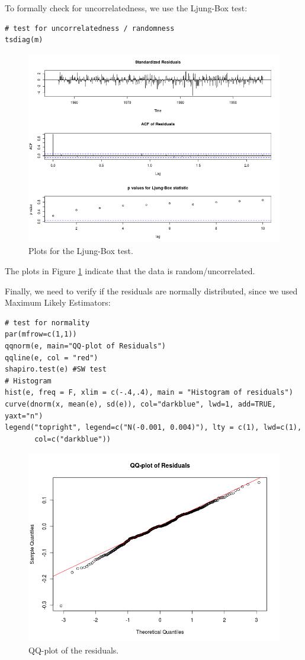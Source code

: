 \documentclass[]{article}
\begin{document}
To formally check for uncorrelatedness, we use the Ljung-Box test:
\begin{Verbatim}[frame=single]
# test for uncorrelatedness / randomness
tsdiag(m)
\end{Verbatim}

\begin{figure}[!ht]
\centering
\includegraphics[width=.8\textwidth]{lbeerljung.png}
\caption{Plots for the Ljung-Box test.}
\label{lbeerljung}
\end{figure}

The plots in Figure \ref{lbeerljung} indicate that the data is random/uncorrelated.

Finally, we need to verify if the residuals are normally distributed, since we used Maximum Likely Estimators:
\begin{Verbatim}[frame=single]
# test for normality
par(mfrow=c(1,1))
qqnorm(e, main="QQ-plot of Residuals")
qqline(e, col = "red")
shapiro.test(e) #SW test
# Histogram
hist(e, freq = F, xlim = c(-.4,.4), main = "Histogram of residuals")
curve(dnorm(x, mean(e), sd(e)), col="darkblue", lwd=1, add=TRUE, yaxt="n")
legend("topright", legend=c("N(-0.001, 0.004)"), lty = c(1), lwd=c(1),
       col=c("darkblue"))
\end{Verbatim}

\begin{figure}[!ht]
\centering
\includegraphics[width=.8\textwidth]{lbeerqq.png}
\caption{QQ-plot of the residuals.}
\label{lbeerqq}
\end{figure}
\end{document}
